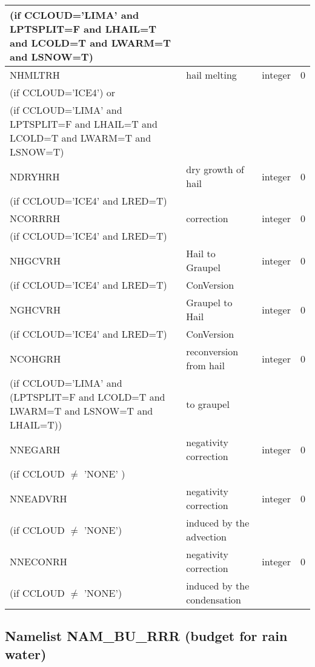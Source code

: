 \begin{longtable} {|p{}|p{}|>{\centering}p{}|p{}<{\centering}|}
(if CCLOUD='LIMA' and LPTSPLIT=F and LHAIL=T and LCOLD=T and LWARM=T and LSNOW=T) & &   &  \\\hline
NHMLTRH  & hail melting  & integer  &  0 \index{NHMLTRH!\innam{NAM\_BU\_RRH}}\\ \nopagebreak
(if CCLOUD='ICE4') or & &   &  \\
(if CCLOUD='LIMA' and LPTSPLIT=F and LHAIL=T and LCOLD=T and LWARM=T and LSNOW=T) & &   &  \\\hline
NDRYHRH  &  dry growth of hail & integer  &  0 \index{NDRYHRH!\innam{NAM\_BU\_RRH}}\\ \nopagebreak
(if CCLOUD='ICE4' and LRED=T) & &   &  \\\hline
NCORRRH  &  correction & integer  &  0 \index{NCORRRH!\innam{NAM\_BU\_RRH}}\\ \nopagebreak
(if CCLOUD='ICE4' and LRED=T) & &   &  \\\hline
NHGCVRH  & Hail to Graupel  & integer  &  0 \index{NHGCVRH!\innam{NAM\_BU\_RRH}}\\ \nopagebreak
(if CCLOUD='ICE4' and LRED=T) & ConVersion  &   &  \\\hline
NGHCVRH  & Graupel to Hail  & integer  &  0 \index{NGHCVRH!\innam{NAM\_BU\_RRH}}\\ \nopagebreak
(if CCLOUD='ICE4' and LRED=T) & ConVersion  &   &  \\\hline
NCOHGRH  & reconversion from hail  & integer  &  0 \index{NCOHGRH!\innam{NAM\_BU\_RRH}}\\ \nopagebreak
(if CCLOUD='LIMA' and (LPTSPLIT=F and LCOLD=T and LWARM=T and LSNOW=T and LHAIL=T)) &to graupel  &   &  \\\hline
NNEGARH   & negativity correction & integer  &  0 \index{NNEGARH!\innam{NAM\_BU\_RRH}}\\ \nopagebreak
(if CCLOUD $\neq$ 'NONE' )& &   &  \\\hline
NNEADVRH  & negativity correction  & integer  &  0 \index{NNEADVRH!\innam{NAM\_BU\_RRH}}\\ \nopagebreak
(if CCLOUD $\neq$ 'NONE') & induced by the advection&   &  \\\hline
NNECONRH  &negativity correction    & integer  &  0 \index{NNECONRH!\innam{NAM\_BU\_RRH}}\\ \nopagebreak
(if CCLOUD $\neq$ 'NONE') &induced by the condensation &   &  \\\hline
\end{longtable}

\subsection{Namelist NAM\_BU\_RRR (budget for rain water)}

